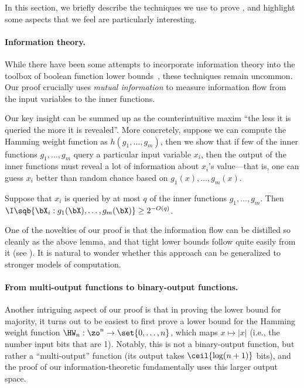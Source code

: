 In this section, we briefly describe the techniques we use to prove , and highlight some aspects that we feel are particularly interesting.



\paragraph*{Information theory.}
While there have been some attempts to incorporate information theory into the toolbox of boolean function lower bounds~\cite{NW95,GMWW14}, these techniques remain uncommon.
Our proof crucially uses
\emph{mutual information} to measure information flow from the input variables to the inner functions.


Our key insight can be summed up as the counterintuitive maxim ``the less it is queried the more it is revealed''.
More concretely, suppose we can compute the Hamming weight function as $h(g_1, \ldots ,g_m)$, then we show that
if few of the inner functions $g_1, \ldots, g_m$ query a particular input variable $x_i$, then the output of the inner functions must reveal a lot of information about $x_i$'s value---that is, one can guess $x_i$ better than random chance based on $g_1(x), \ldots, g_m(x)$.

\begin{lemma}
\label{lemma:insight}
Suppose that $x_i$ is queried by at most $q$ of the inner functions $g_1, \ldots, g_m$.
Then $\I\sqb{\bX_i:g_1(\bX), \ldots, g_m(\bX)} \geq 2^{-O(q)}$.
\end{lemma}

One of the novelties of our proof is that the information flow can be distilled so cleanly as the above lemma, and that tight lower bounds follow quite easily from it (see ).
It is natural to wonder whether this approach can be generalized to stronger models of computation.


\paragraph*{From multi-output functions to binary-output functions.}
Another intriguing aspect of our proof is that in
 proving the lower bound for majority,
it turns out to be easiest to first prove a lower bound for the Hamming weight function $\HW_n: \zo^n\to \set{0, \ldots, n}$, which maps $x \mapsto |x|$ (i.e., the number input bits that are 1).
Notably, this is not a binary-output function, but rather a ``multi-output'' function (its output takes $\ceil{\log (n+1)}$ bits), and the proof of our information-theoretic  fundamentally uses this larger output space.

